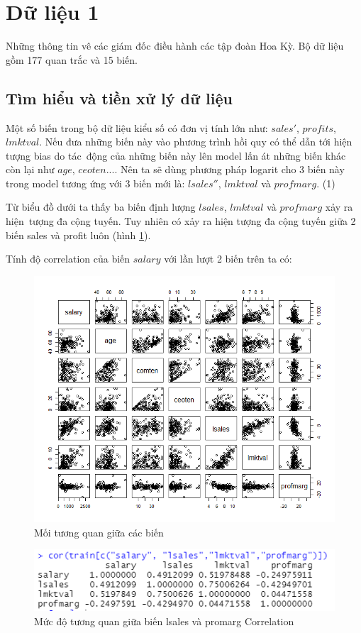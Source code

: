 \section{Dữ liệu 1}
Những thông tin vê các giám đốc điều hành các tập đoàn Hoa Kỳ. Bộ dữ liệu gồm 177 quan trắc và 15 biến.

\subsection*{Tìm hiểu và tiền xử lý dữ liệu}

Một số biến trong bộ dữ liệu kiểu số có đơn vị tính lớn như: $sales'$, $profits$, $lmktval$. Nếu đưa những biến này vào phương trình hồi quy có thể dẫn tới hiện tượng bias do tác~động của những biến này lên model lấn át những biến khác còn lại như $age$, $ceoten$.... Nên ta sẽ dùng phương pháp logarit cho 3 biến này trong model tương ứng với 3 biến mới là:  $lsales''$, $lmktval$   và $profmarg$. (1)


Từ biểu đồ dưới ta thấy ba biến định lượng $\textit{lsales}$, $\textit{lmktval}$ và $\textit{profmarg}$ xảy ra hiện~tượng đa cộng tuyến.
Tuy nhiên có xảy ra hiện tượng đa cộng tuyến giữa 2 biến sales và profit luôn (hình \ref{fig-b1:plot-vars}).

Tính độ correlation của biến $salary$ với lần lượt 2 biến trên ta có:

\begin{figure}[H]
	\centering
	\includegraphics[width=.7\linewidth]{../Photo Of Result/B1_plotVriables.png}  
	\caption{Mối tương quan giữa các biến}
	\label{fig-b1:plot-vars}
\end{figure}

\begin{figure}[H]
	\centering
	\includegraphics[scale = 0.6]{../Photo Of Result/B1_CorTable.PNG}  
	\caption{Mức độ tương quan giữa biến lsales và promarg Correlation}
	\label{fig-b1:corr-table}
\end{figure}

